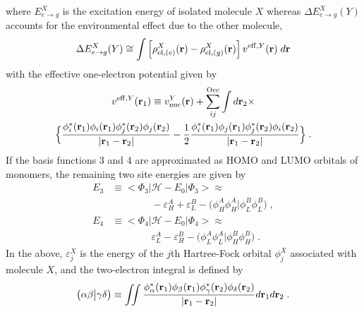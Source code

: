 %
where $E^X_{e\rightarrow g}$ is the excitation energy of isolated molecule $X$ whereas 
$\Delta E^X_{e\rightarrow g}(Y)$ accounts for the environmental effect due to the other molecule,
%
\begin{equation}
 \Delta E^X_{e\rightarrow g}(Y) \cong \int \left[ \rho^{X}_{{\rm el},(e)}({\bf r}) - \rho^{X}_{{\rm el},(g)}({\bf r}) \right]
         v^{{\rm eff},Y}({\bf r}) \; d{\bf r}
\end{equation}
%
with the effective one\hyp{}electron potential given by
%
\begin{multline}
 v^{{\rm eff},Y}({\bf r}_1) \equiv v^{Y}_{\rm nuc}({\bf r})
  + \sum_{ij}^{\rm Occ} \int d{\bf r}_2 \times \\
 \Big\{
 \frac{\phi_i^*({\bf r}_1) \phi_i({\bf r}_1)
                    \phi_j^*({\bf r}_2) \phi_j({\bf r}_2)}{\vert {\bf r}_1 - {\bf r}_2 \vert}
  - \frac{1}{2}
   \frac{\phi_i^*({\bf r}_1) \phi_j({\bf r}_1)
                 \phi_j^*({\bf r}_2) \phi_i({\bf r}_2)}{\vert {\bf r}_1 - {\bf r}_2 \vert}
  \Big\} \;.
\end{multline}
%
If the basis functions 3 and 4 are approximated as HOMO and LUMO orbitals of monomers,
the remaining two site energies are given by
%
\begin{subequations}
\begin{align}
 E_3 &\equiv \big< \Phi_3 \big| \mathscr{H} -E_{0} \big| \Phi_3 \big> \approx \nonumber \\ 
 &\qquad\qquad -\varepsilon_H^A + \varepsilon_L^B - \big( \phi_H^A \phi_H^A \big| \phi_L^B \phi_L^B \big)  \;, \\
 E_4 &\equiv \big< \Phi_4 \big| \mathscr{H} -E_{0} \big| \Phi_4 \big> \approx \nonumber \\
 &\qquad\qquad \varepsilon_L^A - \varepsilon_H^B - \big( \phi_L^A \phi_L^A \big| \phi_H^B \phi_H^B \big)  \;.
\end{align}
\end{subequations}
%
In the above, $\varepsilon_j^X$ is the energy of the $j$th Hartree-Fock orbital $\phi_j^X$ associated with molecule $X$,
and the two\hyp{}electron integral is defined by
%
\begin{equation}
	\bigl( {\alpha\beta} \bigl\lvert {\gamma\delta} \bigr) \equiv
	\iint 
	\frac{ \phi_\alpha^{*}({\bf r}_1) \phi_\beta({\bf r}_1) 
	       \phi_\gamma^{*}({\bf r}_2) \phi_\delta({\bf r}_2) }{ \vert {\bf r}_1 - {\bf r}_2 \vert}
	d{\bf r}_1 d{\bf r}_2  \;.
\end{equation}
%

